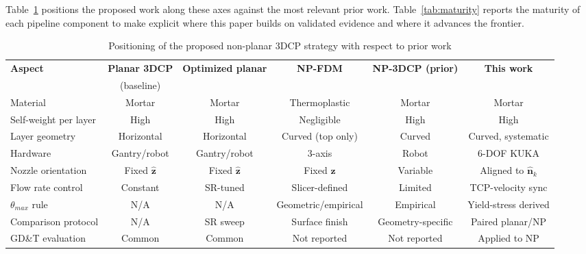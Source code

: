 \documentclass[conference]{IEEEtran}
\begin{document}
Table~\ref{tab:positioning} positions the proposed work along these axes against the most relevant prior work. Table~\ref{tab:maturity} reports the maturity of each pipeline component to make explicit where this paper builds on validated evidence and where it advances the frontier.

\begin{table}[t]
\caption{Positioning of the proposed non-planar 3DCP strategy with respect to prior work}
\label{tab:positioning}
\centering
\renewcommand{\arraystretch}{1.15}
\begin{tabular}{@{}lccccc@{}}
\toprule
\textbf{Aspect} & \textbf{Planar 3DCP} & \textbf{Optimized planar} & \textbf{NP-FDM} & \textbf{NP-3DCP (prior)} & \textbf{This work} \\
                & (baseline) & \cite{foteinopoulos_cement-based_2020,csekei_optimization_2025} & \cite{ahlers_3d_2019} & \cite{vele_enhancing_2024} & \\
\midrule
Material                & Mortar                & Mortar                & Thermoplastic           & Mortar              & Mortar \\
Self-weight per layer   & High                  & High                  & Negligible              & High                & High \\
Layer geometry          & Horizontal            & Horizontal            & Curved (top only)       & Curved              & Curved, systematic \\
Hardware                & Gantry/robot          & Gantry/robot          & 3-axis                  & Robot               & 6-DOF KUKA \\
Nozzle orientation      & Fixed $\hat{\mathbf{z}}$ & Fixed $\hat{\mathbf{z}}$ & Fixed $\hat{\mathbf{z}}$ & Variable          & Aligned to $\hat{\mathbf{n}}_k$ \\
Flow rate control       & Constant              & SR-tuned              & Slicer-defined          & Limited             & TCP-velocity sync \\
$\theta_{max}$ rule     & N/A                   & N/A                   & Geometric/empirical     & Empirical           & Yield-stress derived \\
Comparison protocol     & N/A                   & SR sweep              & Surface finish          & Geometry-specific   & Paired planar/NP \\
GD\&T evaluation        & Common                & Common                & Not reported            & Not reported        & Applied to NP \\
\bottomrule
\end{tabular}
\end{table}
\end{document}
